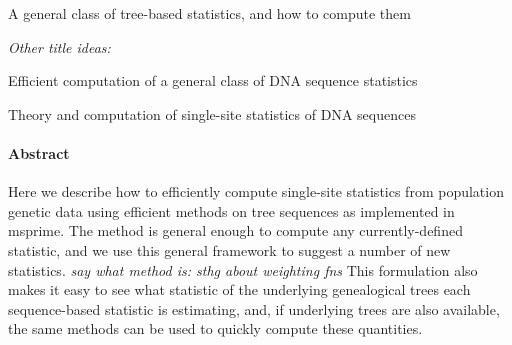 \documentclass{article}
\newcommand{\plr}[1]{{\color{blue} \it #1}}
\begin{document}
\begin{center}
    A general class of tree-based statistics,
    and how to compute them
\end{center}

\emph{Other title ideas:}

Efficient computation of a general class of DNA sequence statistics

Theory and computation of single-site statistics of DNA sequences


\paragraph{Abstract}
Here we describe how to efficiently compute single-site statistics
from population genetic data
using efficient methods on tree sequences as implemented in msprime.
The method is general enough to compute any currently-defined statistic,
and we use this general framework to suggest a number of new statistics.
\plr{say what method is: sthg about weighting fns}
This formulation also makes it easy to see what statistic of the underlying genealogical trees
each sequence-based statistic is estimating,
and, if underlying trees are also available,
the same methods can be used to quickly compute these quantities.


% 
% 
% 
% 
% 
% 
% 
% 
% 
\end{document}
